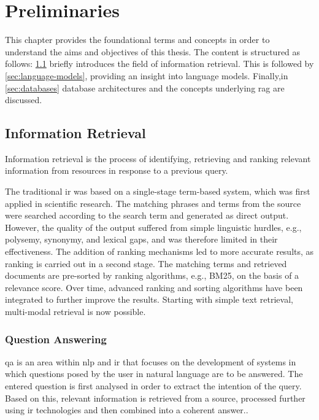 \chapter{Preliminaries}\label{ch:preliminaries}
This chapter provides the foundational terms and concepts in order to understand the aims and objectives of this thesis.
%
The content is structured as follows: \cref{sec:information retrieval} briefly introduces the field of information retrieval. This is followed by \cref{sec:language-models}, providing an insight into language models. 
Finally,in \cref{sec:databases} database architectures and the concepts underlying \ac{rag} are discussed. 
%
\section{Information Retrieval}\label{sec:information retrieval}

\begin{definition}\label{def:information retrieval}
Information retrieval is the process of identifying, retrieving and ranking relevant information from resources in response to a previous query. 
\end{definition}
%
The traditional \ac{ir} was based on a single-stage term-based system, which was first applied in scientific research. 
The matching phrases and terms from the source were searched according to the search term and generated as direct output.
However, the quality of the output suffered from simple linguistic hurdles, e.g., polysemy, synonymy, and lexical gaps, and was therefore limited in their effectiveness. 
The addition of ranking mechanisms led to more accurate results, as ranking is carried out in a second stage. 
The matching terms and retrieved documents are pre-sorted by ranking algorithms, e.g., BM25, on the basis of a relevance score. 
Over time, advanced ranking and sorting algorithms have been integrated to further improve the results. \citep{hambardeIR2023}
Starting with simple text retrieval, multi-modal retrieval is now possible.
%

\subsection{Question Answering}\label{subsec:question answering}

\begin{definition}
\ac{qa} is an area within \ac{nlp} and \ac{ir} that focuses on the development of systems in which questions posed by the user in natural language are to be answered. 
The entered question is first analysed in order to extract the intention of the query. 
Based on this, relevant information is retrieved from a source, processed further using \ac{ir} technologies and then combined into a coherent answer.\citep{Manning2008}.
\end{definition}
%
